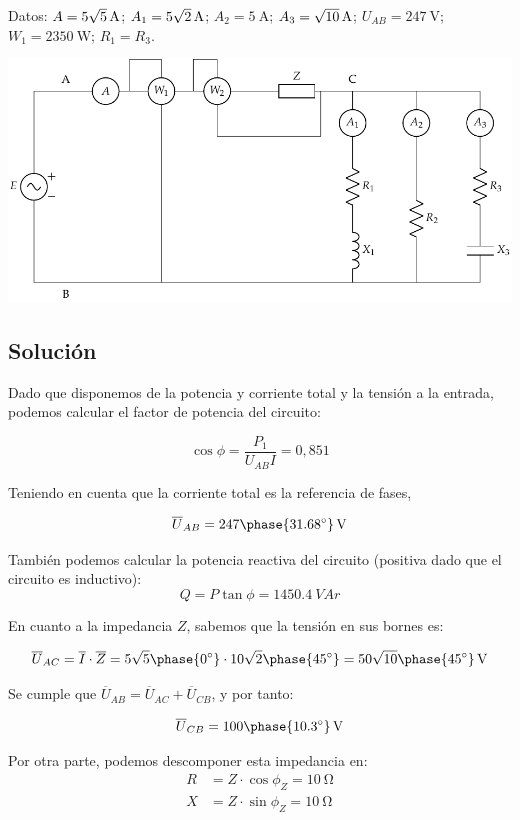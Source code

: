 Datos: $A = \qty[parse-numbers = false]{5\sqrt{5}}{\ampere}$; $A_1 = \qty[parse-numbers = false]{5\sqrt{2}}{\ampere}$; $A_2 = \qty{5}{\ampere}$;  $A_3 = \qty[parse-numbers = false]{\sqrt{10}}{\ampere}$;  $U_{AB} = \qty{247}{\volt}$;  $W_1 = \qty{2350}{\watt}$;
$R_1 = R_3$.

\begin{center}
  \includegraphics[width=0.8\linewidth]{figuras/BT2_17.pdf}
\end{center}


\subsection*{Solución}

Dado que disponemos de la potencia y corriente total y la tensión a
la entrada, podemos calcular el factor de potencia del circuito:

\[
\cos \phi = \frac{P_1}{U_{AB} I} = 0,851
\]

Teniendo en cuenta que la corriente total es la referencia de fases, 

\[
\overline{U}_{AB} = \qty[parse-numbers=false]{247 \phase{\ang{31.68}}}{\V}
\]

También podemos calcular la potencia reactiva del circuito
(positiva dado que el circuito es inductivo):
\[
Q = P \tan \phi = \qty{1450.4}{VA}r
\]


En cuanto a la impedancia $Z$, sabemos que la tensión en sus bornes
es:

\[
\overline{U}_{AC} = \overline{I} \cdot \overline{Z} =
5\sqrt{5}\phase{\ang{0}} \cdot 10\sqrt{2}\phase{\ang{45}} = \qty[parse-numbers=false]{50\sqrt{10}\phase{\ang{45}}}{\V}
\]

Se cumple que $\overline{U}_{AB} = \overline{U}_{AC} +
\overline{U}_{CB}$, y por tanto:

\[
\overline{U}_{CB} = \qty[parse-numbers=false]{100\phase{\ang{10.3}}}{\V}
\]

Por otra parte, podemos descomponer esta impedancia en:
\begin{align*}
  R &= Z \cdot \cos \phi_Z = \qty{10}{\ohm}\\
  X &= Z \cdot \sin \phi_Z = \qty{10}{\ohm}
\end{align*}

